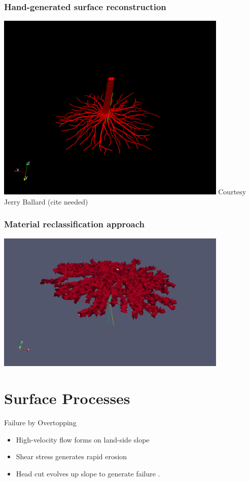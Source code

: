 \documentclass{beamer}
\begin{document}
\begin{frame}
\frametitle{Hand-generated surface reconstruction}
\includegraphics[width=4.35in]{jerry_orig_root_surface.png}
Courtesy Jerry Ballard (cite needed)
\end{frame}

\begin{frame}
\frametitle{Material reclassification approach}
\includegraphics[width=4.35in]{root_zone_coarse_1039766_element_a0_001_tol0_333_block_domain.png}
\end{frame}

\section{Surface Processes}

\begin{frame}{Failure by Overtopping}
\begin{itemize}
\item High-velocity flow forms on land-side slope
\item Shear stress generates rapid erosion 
\item Head cut evolves up slope to generate failure \cite{Briaud_Chen_etal_08}.
\end{itemize}
\end{frame}
\end{document}
